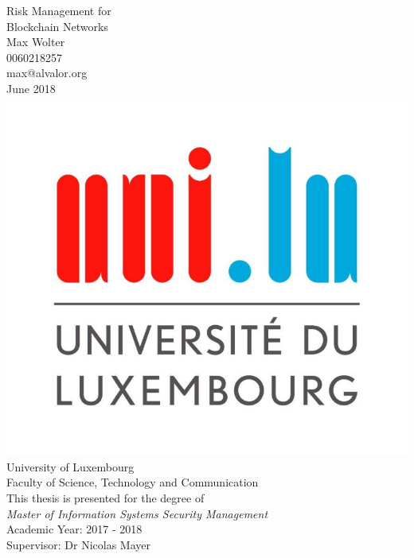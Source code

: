 \documentclass[12pt,a4paper]{article}
\begin{document}
\thispagestyle{empty}

\begin{center}
  {\huge Risk Management for\\Blockchain Networks}\\
  \vspace{1cm}
  {\large Max Wolter\\0060218257\\max@alvalor.org}\\
  \vspace{1cm}
  {\Large June 2018}\\
  \vspace{2cm}
  \includegraphics[scale=0.25]{logo_uni.jpg}\\
  \vspace{1.5cm}
  {\Large University of Luxembourg\\
  Faculty of Science, Technology and Communication}\\
  \vspace{1cm}
  {\large This thesis is presented for the degree of\\
  \textit{Master of Information Systems Security Management}}\\
  \vspace{1cm}
  {\large Academic Year: 2017 - 2018\\Supervisor: Dr Nicolas Mayer}\\
\end{center}
\end{document}
